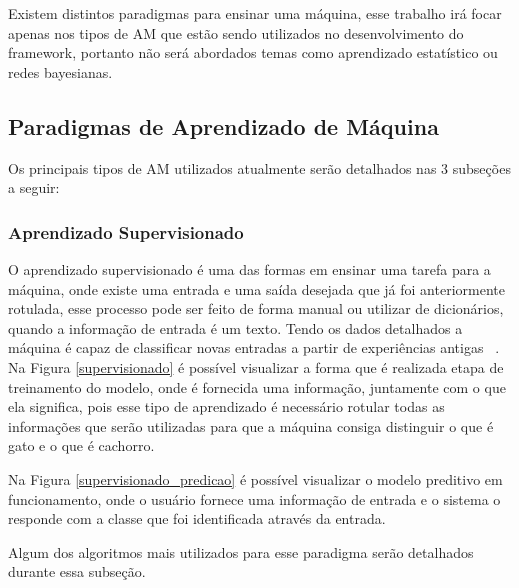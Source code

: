    Existem distintos paradigmas para ensinar uma máquina, esse trabalho irá focar apenas nos tipos de \acrshort{AM} que estão sendo utilizados no desenvolvimento do framework,
    portanto não será abordados temas como aprendizado estatístico ou redes bayesianas.

  \subsection{Paradigmas de Aprendizado de Máquina}

    Os principais tipos de \acrshort{AM} utilizados atualmente serão detalhados nas 3 subseções a seguir:

    \subsubsection{Aprendizado Supervisionado}

      O aprendizado supervisionado é uma das formas em ensinar uma tarefa para a máquina, onde existe uma entrada e uma saída desejada que já foi 
      anteriormente rotulada, esse processo pode ser feito de forma manual ou utilizar de dicionários, quando a informação de entrada é um texto.
      Tendo os dados detalhados a máquina é capaz de classificar novas entradas a partir de experiências antigas ~\cite{mitchell}. Na Figura \ref{supervisionado} é possível visualizar 
      a forma que é realizada etapa de treinamento do modelo, onde é fornecida uma informação, juntamente com o que ela significa, pois esse tipo de aprendizado 
      é necessário rotular todas as informações que serão utilizadas para que a máquina consiga distinguir o que é gato e o que é cachorro.
      


      Na Figura \ref{supervisionado_predicao} é possível visualizar o modelo preditivo em funcionamento, onde o usuário fornece uma informação de entrada
      e o sistema o responde com a classe que foi identificada através da entrada.



      Algum dos algoritmos mais utilizados para esse paradigma serão detalhados durante essa subseção.

